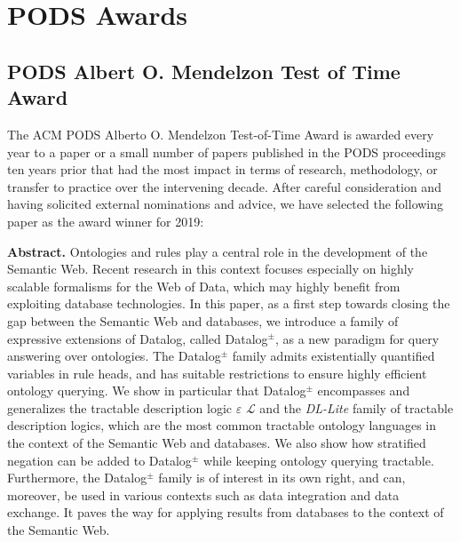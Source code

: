 \clearpage

\section{PODS Awards}

\subsection*{PODS Albert O. Mendelzon Test of Time Award}


The ACM PODS Alberto O. Mendelzon Test-of-Time Award is awarded every year to a paper or a small number of papers published in the PODS proceedings ten years prior that had the most impact in terms of research, methodology, or transfer to practice over the intervening decade. After careful consideration and having solicited external nominations and advice, we have selected the following paper as the award winner for 2019:

\vspace{1mm}

\textbf{Abstract.} Ontologies and rules play a central role in the development of the Semantic Web. Recent research in this context focuses especially on highly scalable formalisms for the Web of Data, which may highly benefit from exploiting database technologies. In this paper, as a first step towards closing the gap between the Semantic Web and databases, we introduce a family of expressive extensions of Datalog, called Datalog$^\pm$, as a new paradigm for query answering over ontologies. The Datalog$^\pm$ family admits existentially quantified variables in rule heads, and has suitable restrictions to ensure highly efficient ontology querying. We show in particular that Datalog$^\pm$ encompasses and generalizes the tractable description logic $\varepsilon$ $\mathscr{L}$ and the \emph{DL-Lite} family of tractable description logics, which are the most common tractable ontology languages in the context of the Semantic Web and databases. We also show how stratified negation can be added to Datalog$^\pm$ while keeping ontology querying tractable. Furthermore, the Datalog$^\pm$ family is of interest in its own right, and can, moreover, be used in various contexts such as data integration and data exchange. It paves the way for applying results from databases to the context of the Semantic Web.

